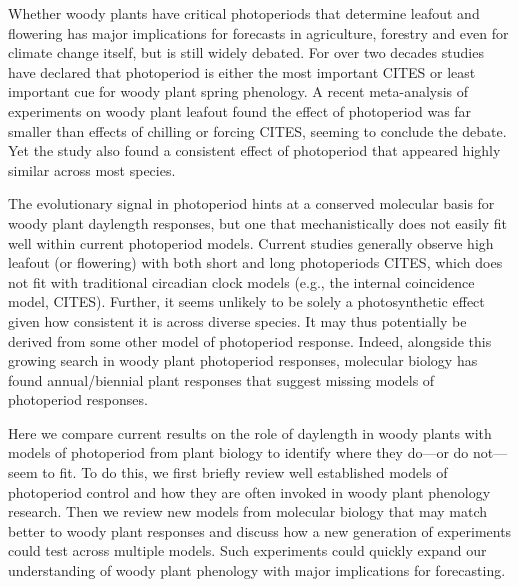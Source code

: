 \documentclass[11pt]{article}
\begin{document}
Whether woody plants have critical photoperiods that determine leafout and flowering has major implications for forecasts in agriculture, forestry and even for climate change itself, but is still widely debated. For over two decades studies have declared that photoperiod is either the most important  CITES or least important cue for woody plant spring phenology. A recent meta-analysis of experiments on woody plant leafout found the effect of photoperiod was far smaller than effects of chilling or forcing CITES, seeming to conclude the debate. Yet the study also found a consistent effect of photoperiod that appeared highly similar across most species. %

The evolutionary signal in photoperiod hints at a conserved molecular basis for woody plant daylength responses, but one that mechanistically does not easily fit well within current photoperiod models. Current studies generally observe high leafout (or flowering) with both short and long photoperiods CITES, which does not fit with traditional circadian clock models (e.g., the internal coincidence model, CITES). Further, it seems unlikely to be solely a photosynthetic effect given how consistent it is across diverse species. It may thus potentially be derived from some other model of photoperiod response. Indeed, alongside this growing search in woody plant photoperiod responses, molecular biology has found annual/biennial plant responses that suggest missing models of photoperiod responses. %

Here we compare current results on the role of daylength in woody plants with models of photoperiod from plant biology to identify where they do---or do not---seem to fit. To do this, we first briefly review well established models of photoperiod control and how they are often invoked in woody plant phenology research. Then we review new models from molecular biology that may match better to woody plant responses and discuss how a new generation of experiments could test across multiple models. Such experiments could quickly expand our understanding of woody plant phenology with major implications for forecasting. 
\end{document}
